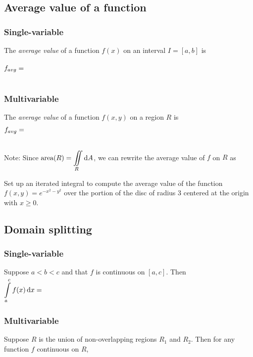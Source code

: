 \vfill

\pagebreak 

\subsection{Average value of a function}
\subsubsection{Single-variable}
The \emph{average value} of a function $f(x)$ on an interval $I=[a,b]$ is
$f_{avg}=\phantom{\displaystyle\dfrac{1}{b-a}\int\limits_a^b f(x)\dx.}$

\vspace{1.5in}

\subsubsection{Multivariable}
The \emph{average value} of a function $f(x,y)$ on a region $R$ is 
$f_{avg}=\phantom{\displaystyle\dfrac{1}{\text{area}(R)}\iint\limits_R f\dA.}$

\vspace{1.5in}

\noindent Note: Since $\text{area}(R)=\displaystyle\iint\limits_R \mathop{}\!\mathrm{d} A$, we can rewrite the average value of $f$ on $R$ as 
\vspace{.5in}

\begin{ex}
    Set up an iterated integral to compute the average value of the function $f(x,y)=e^{-x^2-y^2}$ over the portion of the disc of radius 3 centered at the origin with $x\ge0$.
\end{ex}

\pagebreak 

\subsection{Domain splitting}
\subsubsection{Single-variable}
Suppose $a<b<c$ and that $f$ is continuous on $[a,c]$. Then $\displaystyle\int\limits_a^c f(x)\dx = \phantom{\int\limits_a^b f(x)\dx + \int\limits_b^c f(x)\dx.}$

\vspace{1in}

\subsubsection{Multivariable}
Suppose $R$ is the union of non-overlapping regions $R_1$ and $R_2$. Then for any function $f$ continuous on $R$, \\ \smallskip 

